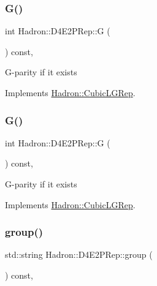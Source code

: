 \subsubsection{\texorpdfstring{G()}{G()}\hspace{0.1cm}{\footnotesize\ttfamily [2/3]}}
{\footnotesize\ttfamily int Hadron\+::\+D4\+E2\+P\+Rep\+::G (\begin{DoxyParamCaption}{ }\end{DoxyParamCaption}) const\hspace{0.3cm}{\ttfamily [inline]}, {\ttfamily [virtual]}}

G-\/parity if it exists 

Implements \mbox{\hyperlink{structHadron_1_1CubicLGRep_ace26f7b2d55e3a668a14cb9026da5231}{Hadron\+::\+Cubic\+L\+G\+Rep}}.

\mbox{\label{structHadron_1_1D4E2PRep_a4c158750cdc343ec7ed414e42b4f757a}} 
\subsubsection{\texorpdfstring{G()}{G()}\hspace{0.1cm}{\footnotesize\ttfamily [3/3]}}
{\footnotesize\ttfamily int Hadron\+::\+D4\+E2\+P\+Rep\+::G (\begin{DoxyParamCaption}{ }\end{DoxyParamCaption}) const\hspace{0.3cm}{\ttfamily [inline]}, {\ttfamily [virtual]}}

G-\/parity if it exists 

Implements \mbox{\hyperlink{structHadron_1_1CubicLGRep_ace26f7b2d55e3a668a14cb9026da5231}{Hadron\+::\+Cubic\+L\+G\+Rep}}.

\mbox{\label{structHadron_1_1D4E2PRep_aed8be064eb6b01ca2b29d54130ac7023}} 
\subsubsection{\texorpdfstring{group()}{group()}\hspace{0.1cm}{\footnotesize\ttfamily [1/3]}}
{\footnotesize\ttfamily std\+::string Hadron\+::\+D4\+E2\+P\+Rep\+::group (\begin{DoxyParamCaption}{ }\end{DoxyParamCaption}) const\hspace{0.3cm}{\ttfamily [inline]}, {\ttfamily [virtual]}}

